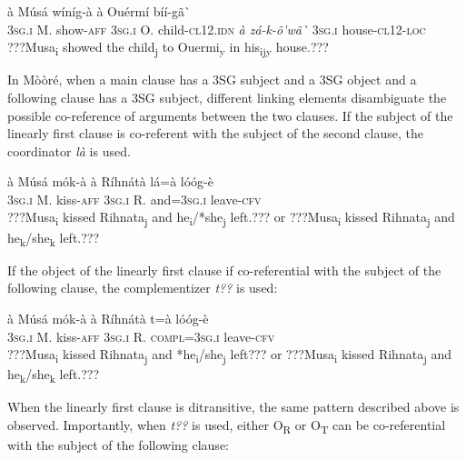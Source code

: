 \documentclass[output=paper]{langsci/langscibook}
\begin{document}
\ea  
\gll à    Músá  wíníg-à  à    Ouérmí  bíí-gã\`{ }    
\\
%
\textsc{3sg.i  }  M.  show-\textsc{aff}  \textsc{3sg.i  }  O.    child\textsc{{}-cl12.idn}    
  \textit{à    zá-k-\~{o}\'{ }wã\`{ }}
  \textsc{3sg.i  }  house-\textsc{cl12-loc}
\\\glt
???Musa\textsubscript{i} showed the child\textsubscript{j} to Ouermi\textsubscript{y} in his\textsubscript{ijy} house.??? 
\z


In Mòòré, when a main clause has a 3SG subject and a 3SG object and a following clause has a 3SG subject, different linking elements disambiguate the possible co-reference of arguments between the two clauses. If the subject of the linearly first clause is co-referent with the subject of the second clause, the coordinator \textit{là} is used.

\ea \gll 
à    Músá  mók-à    à    Ríhnátà  lá=à      lóóg-è
\\
%
\textsc{3sg.i  }  M.  kiss-\textsc{aff}  \textsc{3sg.i    }R.    and=\textsc{3sg.i  }  leave-\textsc{cfv}
\\\glt
???Musa\textsubscript{i} kissed Rihnata\textsubscript{j} and he\textsubscript{i}/*she\textsubscript{j} left.??? or ???Musa\textsubscript{i} kissed Rihnata\textsubscript{j} and he\textsubscript{k}/she\textsubscript{k} left.???
\z

If the object of the linearly first clause if co-referential with the subject of the following clause, the complementizer \textit{t??} is used:


\ea \gll 
à    Músá  mók-à    à    Ríhnátà  t=à        lóóg-è
\\
%
\textsc{3sg.i  }  M.  kiss-\textsc{aff}  \textsc{3sg.i  }  R.    \textsc{compl=3sg.i  }    leave-\textsc{cfv}
\\\glt
???Musa\textsubscript{i} kissed Rihnata\textsubscript{j} and *he\textsubscript{i}/she\textsubscript{j} left??? or ???Musa\textsubscript{i} kissed Rihnata\textsubscript{j} and he\textsubscript{k}/she\textsubscript{k} left.???
\z

When the linearly first clause is ditransitive, the same pattern described above is observed. Importantly, when \textit{t??} is used, either O\textsubscript{R} or O\textsubscript{T }can be co-referential with the subject of the following clause:
\end{document}
